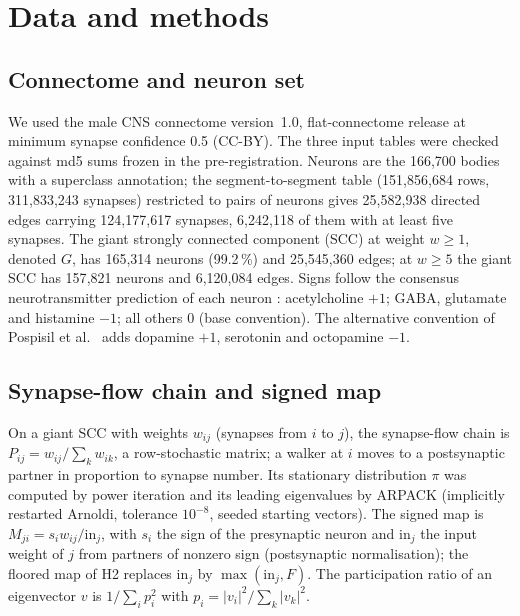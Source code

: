 \section{Data and methods}\label{sec:methods}

\subsection{Connectome and neuron set}

We used the male CNS connectome version~1.0, flat-connectome release at minimum synapse confidence
0.5 \cite{berg2026,malecnsdata} (CC-BY). The three input tables were checked against md5 sums frozen
in the pre-registration. Neurons are the 166{,}700 bodies with a superclass annotation; the
segment-to-segment table (151{,}856{,}684 rows, 311{,}833{,}243 synapses) restricted to pairs of
neurons gives 25{,}582{,}938 directed edges carrying 124{,}177{,}617 synapses, 6{,}242{,}118 of
them with at least five synapses. The giant strongly connected component (SCC) at weight $w\ge 1$,
denoted $G$, has 165{,}314 neurons (99.2\,\%) and 25{,}545{,}360 edges; at $w\ge5$ the giant SCC
has 157{,}821 neurons and 6{,}120{,}084 edges. Signs follow the consensus neurotransmitter
prediction of each neuron \cite{berg2026}: acetylcholine $+1$; GABA, glutamate and histamine $-1$;
all others $0$ (base convention). The alternative convention of Pospisil et al.\ \cite{pospisil2024}
adds dopamine $+1$, serotonin and octopamine $-1$.

\subsection{Synapse-flow chain and signed map}

On a giant SCC with weights $w_{ij}$ (synapses from $i$ to $j$), the synapse-flow chain is
$P_{ij}=w_{ij}/\sum_k w_{ik}$, a row-stochastic matrix; a walker at $i$ moves to a postsynaptic
partner in proportion to synapse number. Its stationary distribution $\pi$ was computed by power
iteration and its leading eigenvalues by ARPACK \cite{lehoucq1998} (implicitly restarted Arnoldi,
tolerance $10^{-8}$, seeded starting vectors). The signed map is $M_{ji}=s_i w_{ij}/\mathrm{in}_j$,
with $s_i$ the sign of the presynaptic neuron and $\mathrm{in}_j$ the input weight of $j$ from
partners of nonzero sign (postsynaptic normalisation); the floored map of H2 replaces
$\mathrm{in}_j$ by $\max(\mathrm{in}_j,F)$. The participation ratio of an eigenvector $v$ is
$1/\sum_i p_i^2$ with $p_i=|v_i|^2/\sum_k |v_k|^2$.

